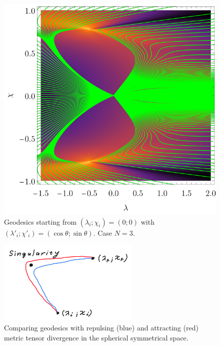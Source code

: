 \begin{figure}[h]
    \centering
    \includegraphics{../img/N=3_geodesics.pdf}
    \caption{Geodesics starting from $(\lambda_i;\chi_i)=(0;0)$ with $(\lambda'_i;\chi'_i)=(\cos\theta;\sin\theta)$. Case $N=3$.}
    \label{fig:N=3_geodesics}    
\end{figure}
\begin{figure}[h]
    \centering
    \includegraphics[width=0.6\textwidth]{../img/geodesicsinGR.png}
    \caption{Comparing geodesics with repulsing (blue) and attracting (red) metric tensor divergence in the spherical symmetrical space. }
    \label{fig:geodesicsinGR}
\end{figure}

